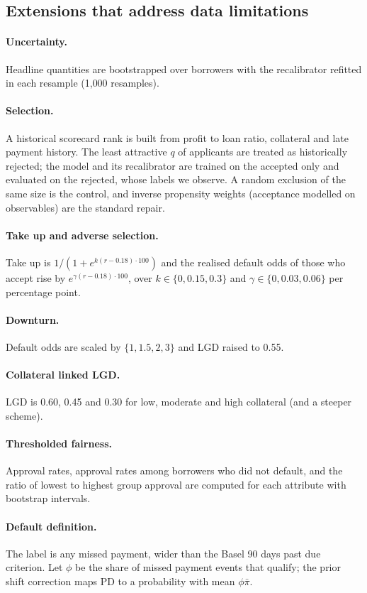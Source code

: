\documentclass[11pt,a4paper]{article}
\newcommand{\PD}{\ensuremath{\mathrm{PD}}}
\begin{document}
\subsection{Extensions that address data limitations}
\paragraph{Uncertainty.} Headline quantities are bootstrapped over borrowers with the recalibrator refitted in each resample (1{,}000 resamples).
\paragraph{Selection.} A historical scorecard rank is built from profit to loan ratio, collateral and late payment history. The least attractive $q$ of applicants are treated as historically rejected; the model and its recalibrator are trained on the accepted only and evaluated on the rejected, whose labels we observe. A random exclusion of the same size is the control, and inverse propensity weights (acceptance modelled on observables) are the standard repair.
\paragraph{Take up and adverse selection.} Take up is $1/(1+e^{k(r-0.18)\cdot100})$ and the realised default odds of those who accept rise by $e^{\gamma(r-0.18)\cdot100}$, over $k\in\{0,0.15,0.3\}$ and $\gamma\in\{0,0.03,0.06\}$ per percentage point.
\paragraph{Downturn.} Default odds are scaled by $\{1,1.5,2,3\}$ and LGD raised to 0.55.
\paragraph{Collateral linked LGD.} LGD is 0.60, 0.45 and 0.30 for low, moderate and high collateral (and a steeper scheme).
\paragraph{Thresholded fairness.} Approval rates, approval rates among borrowers who did not default, and the ratio of lowest to highest group approval are computed for each attribute with bootstrap intervals.
\paragraph{Default definition.} The label is any missed payment, wider than the Basel 90 days past due criterion. Let $\phi$ be the share of missed payment events that qualify; the prior shift correction maps $\PD$ to a probability with mean $\phi\bar\pi$.
\end{document}
